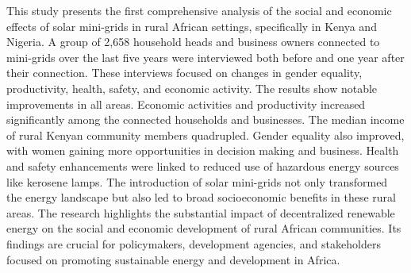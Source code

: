 This study presents the first comprehensive analysis of the social and economic effects of solar mini-grids in rural African settings, specifically in Kenya and Nigeria. A group of 2,658 household heads and business owners connected to mini-grids over the last five years were interviewed both before and one year after their connection. These interviews focused on changes in gender equality, productivity, health, safety, and economic activity. The results show notable improvements in all areas. Economic activities and productivity increased significantly among the connected households and businesses. The median income of rural Kenyan community members quadrupled. Gender equality also improved, with women gaining more opportunities in decision making and business. Health and safety enhancements were linked to reduced use of hazardous energy sources like kerosene lamps. The introduction of solar mini-grids not only transformed the energy landscape but also led to broad socioeconomic benefits in these rural areas. The research highlights the substantial impact of decentralized renewable energy on the social and economic development of rural African communities. Its findings are crucial for policymakers, development agencies, and stakeholders focused on promoting sustainable energy and development in Africa.